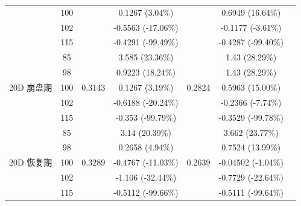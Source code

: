\begin{table}[htbp]
{\begin{tabular}{lclcccc}
    & 100 & & 0.1267 (3.04\%) & & 0.6949 (16.64\%) \\
    & 102 & & -0.5563 (-17.06\%) & & -0.1177 (-3.61\%) \\
    & 115 & & -0.4291 (-99.49\%) & & -0.4287 (-99.40\%) \\
    \midrule
    \multirow{5}{*}{20D 崩盘期}
    & 85 & \multirow{5}{*}{0.3143} & 3.585 (23.36\%) & \multirow{5}{*}{0.2824} & 1.43 (28.29\%) \\
    & 98 & & 0.9223 (18.24\%) & & 1.43 (28.29\%) \\
    & 100 & & 0.1267 (3.19\%) & & 0.5963 (15.00\%) \\
    & 102 & & -0.6188 (-20.24\%) & & -0.2366 (-7.74\%) \\
    & 115 & & -0.353 (-99.79\%) & & -0.3529 (-99.78\%) \\
    \midrule
    \multirow{5}{*}{20D 恢复期}
    & 85 & \multirow{5}{*}{0.3289} & 3.14 (20.39\%) & \multirow{5}{*}{0.2639} & 3.662 (23.77\%) \\
    & 98 & & 0.2658 (4.94\%) & & 0.7524 (13.99\%) \\
    & 100 & & -0.4767 (-11.03\%) & & -0.04502 (-1.04\%) \\
    & 102 & & -1.106 (-32.44\%) & & -0.7729 (-22.64\%) \\
    & 115 & & -0.5112 (-99.66\%) & & -0.5111 (-99.64\%) \\
    \bottomrule
  \end{tabular}%
  }
\end{table}

